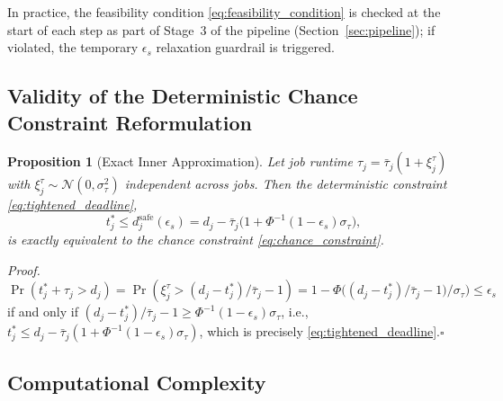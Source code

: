 \documentclass[a4paper,fleqn]{cas-dc}
\begin{document}
In practice, the feasibility condition \eqref{eq:feasibility_condition} is checked at the start of each step as part of Stage~3 of the pipeline (Section~\ref{sec:pipeline}); if violated, the temporary $\epsilon_s$ relaxation guardrail is triggered.

\subsection{Validity of the Deterministic Chance Constraint Reformulation}
\label{sec:cc_validity}

\smallskip
\noindent\textbf{Proposition 1} (Exact Inner Approximation).
\textit{Let job runtime $\tau_j = \bar{\tau}_j(1 + \xi^\tau_j)$ with $\xi^\tau_j \sim \mathcal{N}(0,\sigma^2_\tau)$ independent across jobs. Then the deterministic constraint \eqref{eq:tightened_deadline},}
\[
t^*_j \leq d^{\mathrm{safe}}_j(\epsilon_s) = d_j - \bar{\tau}_j\bigl(1 + \Phi^{-1}(1-\epsilon_s)\sigma_\tau\bigr),
\]
\textit{is exactly equivalent to the chance constraint \eqref{eq:chance_constraint}.}

\smallskip
\noindent\textit{Proof.}
$\Pr(t^*_j + \tau_j > d_j) = \Pr(\xi^\tau_j > (d_j - t^*_j)/\bar{\tau}_j - 1) = 1 - \Phi\big((d_j - t^*_j)/\bar{\tau}_j - 1)/\sigma_\tau\big) \leq \epsilon_s$ if and only if $(d_j - t^*_j)/\bar{\tau}_j - 1 \geq \Phi^{-1}(1-\epsilon_s)\sigma_\tau$, i.e., $t^*_j \leq d_j - \bar{\tau}_j(1 + \Phi^{-1}(1-\epsilon_s)\sigma_\tau)$, which is precisely \eqref{eq:tightened_deadline}.\hfill$\square$

\subsection{Computational Complexity}
\label{sec:complexity}
\end{document}

